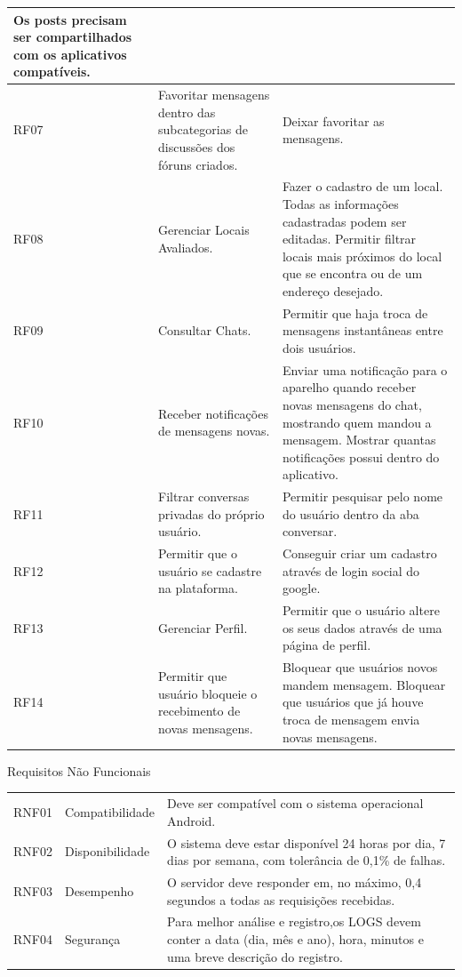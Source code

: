 \begin{longtable}{|p{2.0cm}|p{6.5cm}|p{6.5cm}|}
	Os posts precisam ser compartilhados com os aplicativos compatíveis.\\
	\hline
	RF07 & Favoritar mensagens dentro das subcategorias de discussões dos fóruns criados. & Deixar favoritar as mensagens. \\
	\hline
	RF08 & Gerenciar Locais Avaliados. & Fazer o cadastro de um local. Todas as informações cadastradas podem ser editadas. Permitir filtrar locais mais próximos do local que se encontra ou de um endereço desejado. \\
	\hline
	RF09 & Consultar Chats.   &Permitir que haja troca de mensagens instantâneas entre dois usuários.\\
	\hline
	RF10 &Receber notificações de mensagens novas. &
	Enviar uma notificação para o aparelho quando receber novas mensagens do chat, mostrando quem mandou a mensagem.  
	Mostrar quantas notificações possui  dentro do aplicativo.\\
	\hline
	RF11 & Filtrar conversas privadas do próprio usuário.  & Permitir pesquisar pelo nome do usuário dentro da aba conversar.\\
	\hline
	RF12 & Permitir que o usuário se cadastre na plataforma. & Conseguir criar um cadastro através de login social do google.\\
	\hline
	RF13 & Gerenciar Perfil.  &
	Permitir que o usuário altere os seus dados através de uma página de perfil.  \\
	\hline
	RF14 & Permitir que usuário bloqueie o recebimento de novas mensagens.  & Bloquear que usuários novos mandem mensagem. Bloquear que usuários que já houve troca de mensagem  envia novas mensagens.\\
	\hline
\end{longtable}

\begin{quadro}[htb]
	\centering
	\ABNTEXfontereduzida
	\caption[Requisitos Não Funcionais]{Requisitos Não Funcionais}
	\label{requisitos-nao-funcionais}
	\begin{tabular}{|p{2.0cm}|p{6.5cm}|p{6.5cm}|}
		\hline
		\thead{Código} & \thead{Categoria}  & \thead{Requisito} \\
		\hline
		RNF01 & Compatibilidade &
		Deve ser compatível com o sistema operacional Android.\\
		\hline
		RNF02 & Disponibilidade & O sistema deve estar disponível 24 horas por dia, 7 dias por semana, com tolerância de 0,1\% de falhas. \\
		\hline
		RNF03 & Desempenho & O servidor deve responder em, no máximo, 0,4 segundos a todas as requisições recebidas. \\
		\hline
		RNF04 & Segurança & Para melhor análise e registro,os LOGS devem conter a data (dia, mês e ano), hora, minutos e uma breve descrição do registro.\\
		\hline
	\end{tabular}
\end{quadro}


